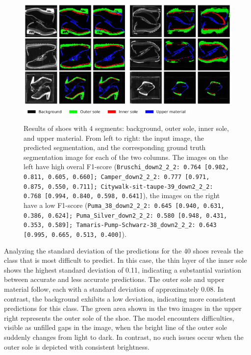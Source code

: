 \begin{figure}[H]
	\centering
	\includegraphics[width=1.0\textwidth]{./images/Paper_4Segments.png}
	\includegraphics[width=0.8\textwidth]{./images/color_legend_4_classes.png}
	\caption[Results of shoes with 4 segments: background, outer and inner sole, and upper material]{Results of shoes with 4 segments: background, outer sole, inner sole, and upper material. From left to right: the input image, the predicted segmentation, and the corresponding ground truth segmentation image for each of the two columns. The images on the left have high overal F1-score ({\tt \small Bruschi\_down2\_2\_2: 0.764 [0.982, 0.811, 0.605, 0.660]\footnotemark; Camper\_down2\_2\_2: 0.777 [0.971, 0.875, 0.550, 0.711]; Citywalk-sit-taupe-39\_down2\_2\_2: 0.768 [0.994, 0.840, 0.598, 0.641]}), the images on the right have a low F1-score ({\tt \small Puma\_38\_down2\_2\_2: 0.645 [0.940, 0.631, 0.386, 0.624]; Puma\_Silver\_down2\_2\_2:  0.580 [0.948, 0.431, 0.353, 0.589]; Tamaris-Pump-Schwarz-38\_down2\_2\_2: 0.643 [0.995, 0.665, 0.513, 0.400]}).}
	\label{Paper_4Segments}
\end{figure}

Analyzing the standard deviation of the predictions for the 40 shoes reveals the class that is most difficult to predict. In this case, the thin layer of the inner sole shows the highest standard deviation of 0.11, indicating a substantial variation between accurate and less accurate predictions. The outer sole and upper material follow, each with a standard deviation of approximately 0.08. In contrast, the background exhibits a low deviation, indicating more consistent predictions for this class. The green area shown in the two images in the upper right represents the outer sole of the shoe. The model encounters difficulties, visible as unfilled gaps in the image, when the bright line of the outer sole suddenly changes from light to dark. In contrast, no such issues occur when the outer sole is depicted with consistent brightness.

